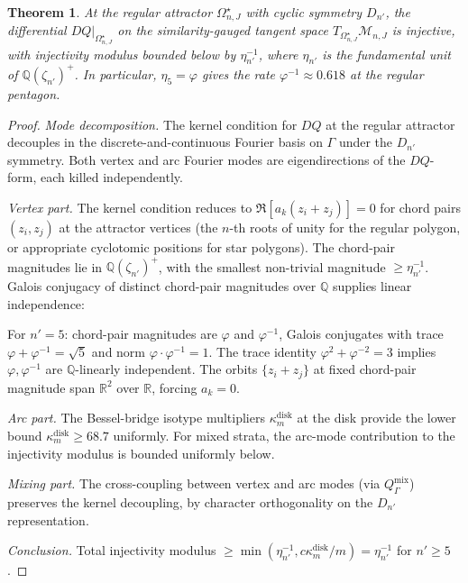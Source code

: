 \documentclass[11pt,reqno]{amsart}
\theoremstyle{plain}
\newtheorem{theorem}{Theorem}[section]
\theoremstyle{definition}
\theoremstyle{remark}
\newcommand{\Reals}{\mathbb{R}}
\newcommand{\Rats}{\mathbb{Q}}
\newcommand{\Mcal}{\mathcal{M}}
\newcommand{\Qop}{Q}
\begin{document}
\begin{theorem}\label{thm:rigidity-master}
At the regular attractor $\Omega^\star_{n,J}$ with cyclic symmetry $D_{n'}$, the differential $D\Qop|_{\Omega^\star_{n,J}}$ on the similarity-gauged tangent space $T_{\Omega^\star_{n,J}}\Mcal_{n,J}$ is injective, with injectivity modulus bounded below by $\eta_{n'}^{-1}$, where $\eta_{n'}$ is the fundamental unit of $\Rats(\zeta_{n'})^+$. In particular, $\eta_5 = \varphi$ gives the rate $\varphi^{-1} \approx 0.618$ at the regular pentagon.
\end{theorem}

\begin{proof}
\emph{Mode decomposition.} The kernel condition for $D\Qop$ at the regular attractor decouples in the discrete-and-continuous Fourier basis on $\Gamma$ under the $D_{n'}$ symmetry. Both vertex and arc Fourier modes are eigendirections of the $D\Qop$-form, each killed independently.

\emph{Vertex part.} The kernel condition reduces to $\Re[a_k(z_i + z_j)] = 0$ for chord pairs $(z_i, z_j)$ at the attractor vertices (the $n$-th roots of unity for the regular polygon, or appropriate cyclotomic positions for star polygons). The chord-pair magnitudes lie in $\Rats(\zeta_{n'})^+$, with the smallest non-trivial magnitude $\geq \eta_{n'}^{-1}$. Galois conjugacy of distinct chord-pair magnitudes over $\Rats$ supplies linear independence:

For $n' = 5$: chord-pair magnitudes are $\varphi$ and $\varphi^{-1}$, Galois conjugates with trace $\varphi + \varphi^{-1} = \sqrt 5$ and norm $\varphi \cdot \varphi^{-1} = 1$. The trace identity $\varphi^2 + \varphi^{-2} = 3$ implies $\varphi, \varphi^{-1}$ are $\Rats$-linearly independent. The orbits $\{z_i + z_j\}$ at fixed chord-pair magnitude span $\Reals^2$ over $\Reals$, forcing $a_k = 0$.

\emph{Arc part.} The Bessel-bridge isotype multipliers $\kappa_m^{\mathrm{disk}}$ at the disk \cite[\S 5]{GulatiSmooth} provide the lower bound $\kappa_m^{\mathrm{disk}} \geq 68.7$ uniformly. For mixed strata, the arc-mode contribution to the injectivity modulus is bounded uniformly below.

\emph{Mixing part.} The cross-coupling between vertex and arc modes (via $\Qop_\Gamma^{\mathrm{mix}}$) preserves the kernel decoupling, by character orthogonality on the $D_{n'}$ representation.

\emph{Conclusion.} Total injectivity modulus $\geq \min(\eta_{n'}^{-1}, c\kappa_m^{\mathrm{disk}}/m) = \eta_{n'}^{-1}$ for $n' \geq 5$.
\end{proof}
\end{document}
